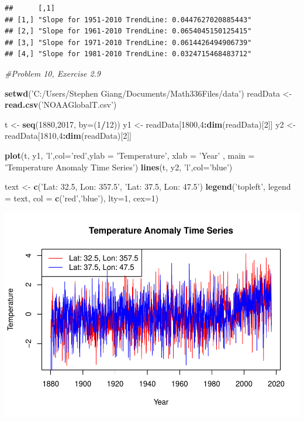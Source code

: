 \documentclass[
]{article}
\newenvironment{Shaded}{\begin{snugshade}}{\end{snugshade}}
\newcommand{\CommentTok}[1]{\textcolor[rgb]{0.56,0.35,0.01}{\textit{#1}}}
\newcommand{\DataTypeTok}[1]{\textcolor[rgb]{0.13,0.29,0.53}{#1}}
\newcommand{\DecValTok}[1]{\textcolor[rgb]{0.00,0.00,0.81}{#1}}
\newcommand{\KeywordTok}[1]{\textcolor[rgb]{0.13,0.29,0.53}{\textbf{#1}}}
\newcommand{\NormalTok}[1]{#1}
\newcommand{\OperatorTok}[1]{\textcolor[rgb]{0.81,0.36,0.00}{\textbf{#1}}}
\newcommand{\StringTok}[1]{\textcolor[rgb]{0.31,0.60,0.02}{#1}}
\begin{document}
\begin{verbatim}
##      [,1]                                               
## [1,] "Slope for 1951-2010 TrendLine: 0.0447627020885443"
## [2,] "Slope for 1961-2010 TrendLine: 0.0654045150125415"
## [3,] "Slope for 1971-2010 TrendLine: 0.0614426494906739"
## [4,] "Slope for 1981-2010 TrendLine: 0.0324715468483712"
\end{verbatim}
\newpage
\begin{Shaded}
\begin{Highlighting}[]
\CommentTok{#Problem 10, Exercise 2.9}

\KeywordTok{setwd}\NormalTok{(}\StringTok{'C:/Users/Stephen Giang/Documents/Math336Files/data'}\NormalTok{)}
\NormalTok{readData <-}\StringTok{ }\KeywordTok{read.csv}\NormalTok{(}\StringTok{'NOAAGlobalT.csv'}\NormalTok{)}

\NormalTok{t <-}\StringTok{ }\KeywordTok{seq}\NormalTok{(}\DecValTok{1880}\NormalTok{,}\DecValTok{2017}\NormalTok{, }\DataTypeTok{by=}\NormalTok{(}\DecValTok{1}\OperatorTok{/}\DecValTok{12}\NormalTok{))}
\NormalTok{y1 <-}\StringTok{ }\NormalTok{readData[}\DecValTok{1800}\NormalTok{,}\DecValTok{4}\OperatorTok{:}\KeywordTok{dim}\NormalTok{(readData)[}\DecValTok{2}\NormalTok{]]}
\NormalTok{y2 <-}\StringTok{ }\NormalTok{readData[}\DecValTok{1810}\NormalTok{,}\DecValTok{4}\OperatorTok{:}\KeywordTok{dim}\NormalTok{(readData)[}\DecValTok{2}\NormalTok{]]}

\KeywordTok{plot}\NormalTok{(t, y1, }\StringTok{'l'}\NormalTok{,}\DataTypeTok{col=}\StringTok{'red'}\NormalTok{,}\DataTypeTok{ylab =} \StringTok{'Temperature'}\NormalTok{, }\DataTypeTok{xlab =} \StringTok{'Year'}\NormalTok{ ,}
     \DataTypeTok{main =} \StringTok{'Temperature Anomaly Time Series'}\NormalTok{)}
\KeywordTok{lines}\NormalTok{(t, y2, }\StringTok{'l'}\NormalTok{,}\DataTypeTok{col=}\StringTok{'blue'}\NormalTok{)}

\NormalTok{text <-}\StringTok{ }\KeywordTok{c}\NormalTok{(}\StringTok{'Lat: 32.5, Lon: 357.5'}\NormalTok{, }\StringTok{'Lat: 37.5, Lon: 47.5'}\NormalTok{)}
\KeywordTok{legend}\NormalTok{(}\StringTok{'topleft'}\NormalTok{, }\DataTypeTok{legend =}\NormalTok{ text, }\DataTypeTok{col =} \KeywordTok{c}\NormalTok{(}\StringTok{'red'}\NormalTok{,}\StringTok{'blue'}\NormalTok{), }\DataTypeTok{lty=}\DecValTok{1}\NormalTok{, }\DataTypeTok{cex=}\DecValTok{1}\NormalTok{)}
\end{Highlighting}
\end{Shaded}

\includegraphics{Assignment1_files/figure-latex/prob10-1.pdf}
\end{document}
